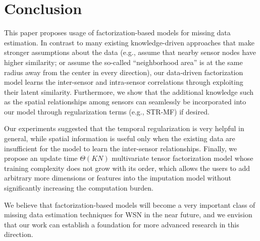 \section{Conclusion}  \label{sec:conc}
This paper proposes usage of factorization-based models for missing data estimation.
In contrast to many existing knowledge-driven approaches that make stronger assumptions about the data (e.g., assume that nearby sensor nodes have higher similarity; or assume the so-called ``neighborhood area'' is at the same radius away from the center in every direction), our data-driven factorization model learns the inter-sensor and intra-sensor correlations through exploiting their latent similarity.
Furthermore, we show that the additional knowledge such as the spatial relationships among sensors can seamlessly be incorporated into our model through regularization terms (e.g., STR-MF) if desired.

Our experiments suggested that the temporal regularization is very helpful in general, while spatial information is useful only when the existing data are insufficient for the model to learn the inter-sensor relationships.
Finally, we propose an update time $\Theta(KN)$ multivariate tensor factorization model whose training complexity does not grow with its order, which allows the users to add arbitrary more dimensions or features into the imputation model without significantly increasing the computation burden.

We believe that factorization-based models will become a very important class of missing data estimation techniques for WSN in the near future, and we envision that our work can establish a foundation for more advanced research in this direction.
